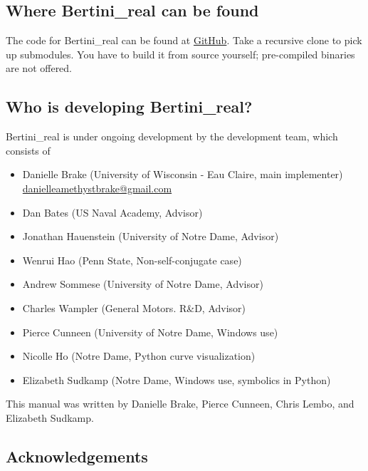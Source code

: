 \subsection{Where Bertini\_real can be found}
		
	The code for Bertini\_real can be found at \href{https://github.com/ofloveandhate/bertini_real}{GitHub}.  Take a recursive clone to pick up submodules.  You have to build it from source yourself; pre-compiled binaries are not offered. 


	\subsection{Who is developing Bertini\_real?}

	Bertini\_real is under ongoing development by the development team, which consists of 

	\begin{itemize}
		\item Danielle Brake (University of Wisconsin - Eau Claire, main implementer)  \\ \href{mailto:danielleamethystbrake@gmail.com}{danielleamethystbrake@gmail.com} 
		\item Dan Bates (US Naval Academy, Advisor)
		\item Jonathan Hauenstein (University of Notre Dame, Advisor)
		\item Wenrui Hao (Penn State, Non-self-conjugate case)
		\item Andrew Sommese (University of Notre Dame, Advisor)
		\item Charles Wampler (General Motors. R\&D, Advisor)
		\item Pierce Cunneen (University of Notre Dame, Windows use) 
		\item Nicolle Ho (Notre Dame, Python curve visualization)
		\item Elizabeth Sudkamp (Notre Dame, Windows use, symbolics in Python)
	\end{itemize}
	This manual was written by Danielle Brake, Pierce Cunneen, Chris Lembo, and Elizabeth Sudkamp.



\subsection{Acknowledgements}

